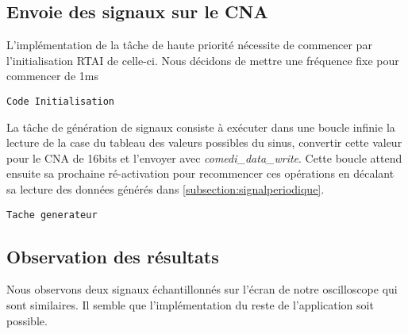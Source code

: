 \subsection{Envoie des signaux sur le CNA}
L'implémentation de la tâche de haute priorité nécessite de commencer par l'initialisation RTAI de celle-ci. Nous décidons de mettre une fréquence fixe pour commencer de 1ms  
\begin{lstlisting}
Code Initialisation
\end{lstlisting}
La tâche de génération de signaux consiste à exécuter dans une boucle infinie la lecture de la case du tableau des valeurs possibles du sinus, convertir cette valeur pour le CNA de 16bits et l'envoyer avec \emph{comedi\_data\_write}. Cette boucle attend ensuite sa prochaine ré-activation pour recommencer ces opérations en décalant sa lecture des données générés dans \ref{subsection:signalperiodique}.
\begin{lstlisting}
Tache generateur
\end{lstlisting}

\subsection{Observation des résultats}
Nous observons deux signaux échantillonnés sur l'écran de notre oscilloscope qui sont similaires. Il semble que l'implémentation du reste de l'application soit possible. 